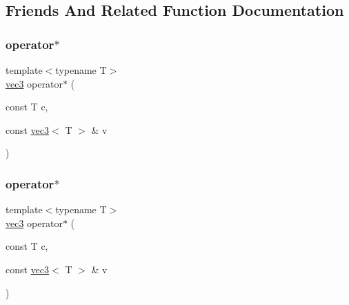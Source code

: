 \subsection{Friends And Related Function Documentation}
\mbox{\label{struct_space_h_1_1vec3_a4f0b2685679a321b6c43a7406719c3a5}} 
\subsubsection{\texorpdfstring{operator$\ast$}{operator*}\hspace{0.1cm}{\footnotesize\ttfamily [1/3]}}
{\footnotesize\ttfamily template$<$typename T$>$ \\
\mbox{\hyperlink{struct_space_h_1_1vec3}{vec3}} operator$\ast$ (\begin{DoxyParamCaption}\item[{const T}]{c,  }\item[{const \mbox{\hyperlink{struct_space_h_1_1vec3}{vec3}}$<$ T $>$ \&}]{v }\end{DoxyParamCaption})\hspace{0.3cm}{\ttfamily [friend]}}

\mbox{\label{struct_space_h_1_1vec3_a4f0b2685679a321b6c43a7406719c3a5}} 
\subsubsection{\texorpdfstring{operator$\ast$}{operator*}\hspace{0.1cm}{\footnotesize\ttfamily [2/3]}}
{\footnotesize\ttfamily template$<$typename T$>$ \\
\mbox{\hyperlink{struct_space_h_1_1vec3}{vec3}} operator$\ast$ (\begin{DoxyParamCaption}\item[{const T}]{c,  }\item[{const \mbox{\hyperlink{struct_space_h_1_1vec3}{vec3}}$<$ T $>$ \&}]{v }\end{DoxyParamCaption})\hspace{0.3cm}{\ttfamily [friend]}}

\mbox{\label{struct_space_h_1_1vec3_a4f0b2685679a321b6c43a7406719c3a5}} 
